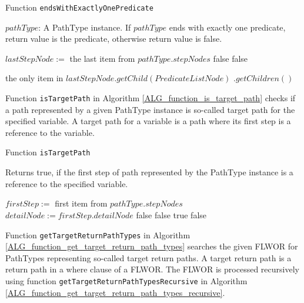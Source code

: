 \begin{algorithm}
\caption{Function \texttt{endsWithExactlyOnePredicate}}
\label{ALG_function_ends_with_exactly_one_predicate}
\begin{algorithmic}[1]
\REQUIRE $pathType$: A PathType instance.
\ENSURE If $pathType$ ends with exactly one predicate, return value is the predicate, otherwise return value is false.

\STATE $lastStepNode :=$ the last item from $pathType.stepNodes$
	\RETURN false
\ENDIF
{}
	\RETURN false
\ENDIF

\RETURN the only item in $lastStepNode.getChild(PredicateListNode)$ $.getChildren()$
\end{algorithmic}
\end{algorithm}

Function \texttt{isTargetPath} in Algorithm \ref{ALG_function_is_target_path} checks if a path represented by a given PathType instance is so-called target path for the specified variable. A target path for a variable is a path where its first step is a reference to the variable.

\begin{algorithm}
\caption{Function \texttt{isTargetPath}}
\label{ALG_function_is_target_path}
\begin{algorithmic}[1]
\ENSURE Returns true, if the first step of path represented by the PathType instance is a reference to the specified variable.

\STATE $firstStep :=$ first item from  $pathType.stepNodes$
\STATE $detailNode := firstStep.detailNode$
	\RETURN false
\ENDIF
{}
	\RETURN false
\ENDIF
{}
	\RETURN true
\ELSE
	\RETURN false
\ENDIF
\end{algorithmic}
\end{algorithm}

Function \texttt{getTargetReturnPathTypes} in Algorithm \ref{ALG_function_get_target_return_path_types} searches the given FLWOR for PathTypes representing so-called target return paths. A target return path is a return path in a where clause of a FLWOR. The FLWOR is processed recursively using function \texttt{getTargetReturnPathTypesRecursive} in Algorithm \ref{ALG_function_get_target_return_path_types_recursive}.

